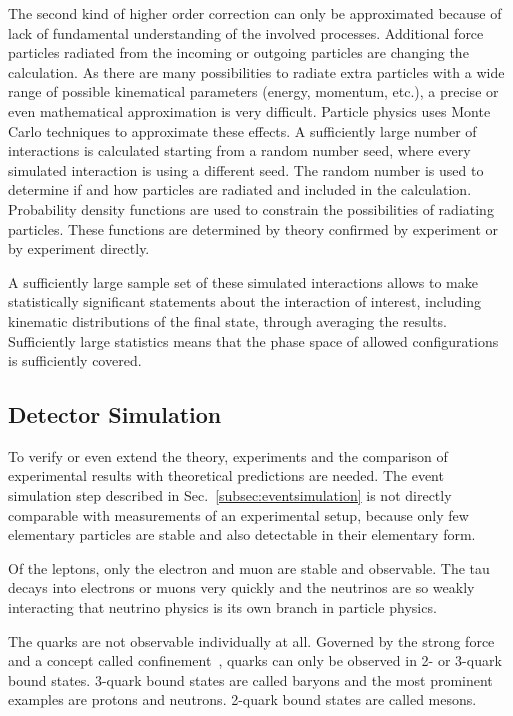 \documentclass{wscpaperproc}
\theoremstyle{wsc}
\begin{document}
The second kind of higher order correction can only be approximated because of lack of fundamental understanding of the involved processes. Additional force particles radiated from the incoming or outgoing particles are changing the calculation. As there are many possibilities to radiate extra particles with a wide range of possible kinematical parameters (energy, momentum, etc.), a precise or even mathematical approximation is very difficult. Particle physics uses Monte Carlo techniques to approximate these effects. A sufficiently large number of interactions is calculated starting from a random number seed, where every simulated interaction is using a different seed. The random number is used to determine if and how particles are radiated and included in the calculation. Probability density functions are used to constrain the possibilities of radiating particles. These functions are determined by theory confirmed by experiment or by experiment directly.

A sufficiently large sample set of these simulated interactions allows to make statistically significant statements about the interaction of interest, including kinematic distributions of the final state, through averaging the results. Sufficiently large statistics means that the phase space of allowed configurations is sufficiently covered.

\subsection{Detector Simulation} 
\label{subsec:detectorsimulation}

To verify or even extend the theory, experiments and the comparison of experimental results with theoretical predictions are needed. The event simulation step described in Sec.~\ref{subsec:eventsimulation} is not directly comparable with measurements of an experimental setup, because only few elementary particles are stable and also detectable in their elementary form.

Of the leptons, only the electron and muon are stable and observable. The tau decays into electrons or muons very quickly and the neutrinos are so weakly interacting that neutrino physics is its own branch in particle physics. 

The quarks are not observable individually at all. Governed by the strong force and a concept called confinement~, quarks can only be observed in 2- or 3-quark bound states. 3-quark bound states are called baryons and the most prominent examples are protons and neutrons. 2-quark bound states are called mesons. 
\end{document}

